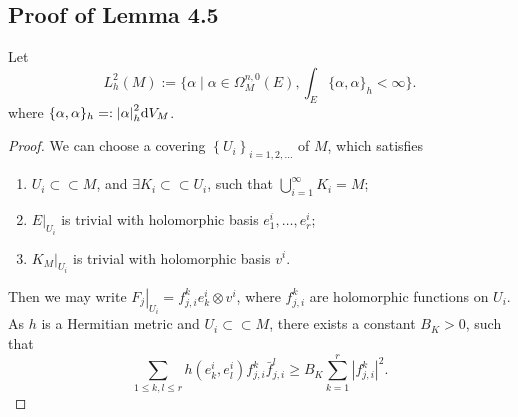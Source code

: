 \documentclass[twoside,openany,12pt]{beautynote}
\begin{document}
\subsection{Proof of Lemma 4.5}

Let 
\[
  L^2_h(M):=\biggl\{\alpha\mid \alpha\in \Omega^{n,0}_M(E),\int_E \{\alpha,\alpha\}_h<\infty\biggr\}.
\]
where $\{\alpha,\alpha\}_h=:\abs{\alpha}_h^2 \dd V_M$.
\begin{proof}
  We can choose a covering $\left\{U_i\right\}_{i=1,2, \ldots}$ of $M$, which satisfies
  \begin{enumerate}[label=(\arabic*)]
    \item $U_i \subset \subset M$, and $\exists K_i \subset \subset U_i$, such that $\bigcup_{i=1}^{\infty} K_i=M$;
    \item $\left.E\right|_{U_i}$ is trivial with holomorphic basis $e_1^i, \ldots, e_r^i$;
    \item $\left.K_M\right|_{U_i}$ is trivial with holomorphic basis $v^i$.
  \end{enumerate}

Then we may write $\left.F_j\right|_{U_i}=f_{j, i}^k e_k^i \otimes v^i$, where $f_{j, i}^k$ are holomorphic functions on $U_i$. As $h$ is a Hermitian metric and $U_i \subset \subset M$, there exists a constant $B_K>0$, such that
$$
\sum_{1 \leq k, l \leq r} h\left(e_k^i, e_l^i\right) f_{j, i}^k \bar{f}_{j, i}^l \geq B_K \sum_{k=1}^r\left|f_{j, i}^k\right|^2 .
$$


\end{proof}
\end{document}
